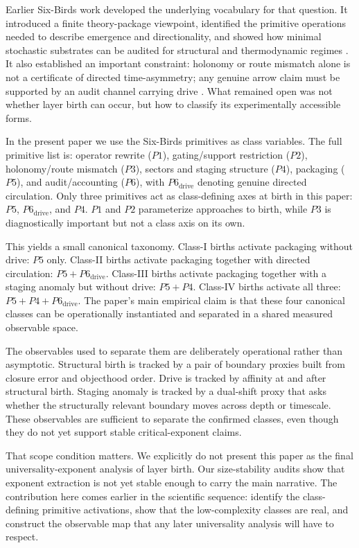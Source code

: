 \documentclass[11pt]{article}
\begin{document}
Earlier Six-Birds work developed the underlying vocabulary for that question. It introduced a finite theory-package viewpoint, identified the primitive operations needed to describe emergence and directionality, and showed how minimal stochastic substrates can be audited for structural and thermodynamic regimes \cite{sixbirds_foundations,sixbirds_create_stone}. It also established an important constraint: holonomy or route mismatch alone is not a certificate of directed time-asymmetry; any genuine arrow claim must be supported by an audit channel carrying drive \cite{sixbirds_protocol_trap,liang_pigolotti_2023,seifert_2012}. What remained open was not whether layer birth can occur, but how to classify its experimentally accessible forms.

In the present paper we use the Six-Birds primitives as class variables. The full primitive list is: operator rewrite ($P1$), gating/support restriction ($P2$), holonomy/route mismatch ($P3$), sectors and staging structure ($P4$), packaging ($P5$), and audit/accounting ($P6$), with $P6_{\mathrm{drive}}$ denoting genuine directed circulation. Only three primitives act as class-defining axes at birth in this paper: $P5$, $P6_{\mathrm{drive}}$, and $P4$. $P1$ and $P2$ parameterize approaches to birth, while $P3$ is diagnostically important but not a class axis on its own.

This yields a small canonical taxonomy. Class-I births activate packaging without drive: $P5$ only. Class-II births activate packaging together with directed circulation: $P5 + P6_{\mathrm{drive}}$. Class-III births activate packaging together with a staging anomaly but without drive: $P5 + P4$. Class-IV births activate all three: $P5 + P4 + P6_{\mathrm{drive}}$. The paper's main empirical claim is that these four canonical classes can be operationally instantiated and separated in a shared measured observable space.

The observables used to separate them are deliberately operational rather than asymptotic. Structural birth is tracked by a pair of boundary proxies built from closure error and objecthood order. Drive is tracked by affinity at and after structural birth. Staging anomaly is tracked by a dual-shift proxy that asks whether the structurally relevant boundary moves across depth or timescale. These observables are sufficient to separate the confirmed classes, even though they do not yet support stable critical-exponent claims.

That scope condition matters. We explicitly do not present this paper as the final universality-exponent analysis of layer birth. Our size-stability audits show that exponent extraction is not yet stable enough to carry the main narrative. The contribution here comes earlier in the scientific sequence: identify the class-defining primitive activations, show that the low-complexity classes are real, and construct the observable map that any later universality analysis will have to respect.
\end{document}
